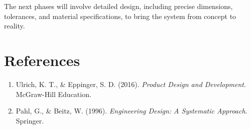 \documentclass[12pt]{article}
\begin{document}
The next phases will involve detailed design, including precise dimensions, tolerances, and material specifications, to bring the system from concept to reality.

\section*{References}
\begin{enumerate}
    \item Ulrich, K. T., \& Eppinger, S. D. (2016). \textit{Product Design and Development}. McGraw-Hill Education.
    \item Pahl, G., \& Beitz, W. (1996). \textit{Engineering Design: A Systematic Approach}. Springer.
\end{enumerate}
\end{document}
